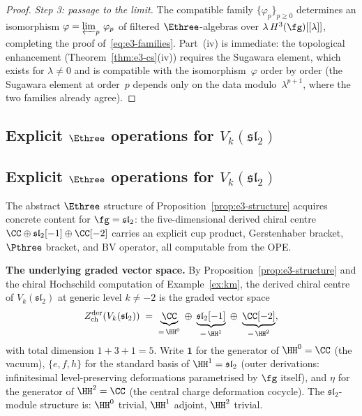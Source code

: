 \begin{proof}
\smallskip
\noindent\textit{Step 3: passage to the limit.}
The compatible family $\{\varphi_p\}_{p \geq 0}$
determines an isomorphism
$\varphi = \varprojlim_p\,\varphi_p$
of filtered $\Ethree$-algebras over
$\lambda\,H^3(\fg)[[\lambda]]$, completing the proof
of~\eqref{eq:e3-families}.
Part~(iv) is immediate: the topological enhancement
(Theorem~\ref{thm:e3-cs}(iv)) requires the Sugawara
element, which exists for $\lambda \neq 0$ and is
compatible with the isomorphism~$\varphi$ order by order
(the Sugawara element at order~$p$ depends only on the
data modulo~$\lambda^{p+1}$, where the two families
already agree).
\end{proof}

\subsection{Explicit $\Ethree$ operations for
$V_k(\mathfrak{sl}_2)$}
\label{subsec:e3-explicit}

\subsection{Explicit $\Ethree$ operations for
$V_k(\mathfrak{sl}_2)$}
\label{subsec:e3-explicit}

The abstract $\Ethree$ structure of
Proposition~\ref{prop:e3-structure} acquires concrete content
for $\fg = \mathfrak{sl}_2$: the five-dimensional derived
chiral centre $\CC \oplus \mathfrak{sl}_2[-1] \oplus \CC[-2]$
carries an explicit cup product, Gerstenhaber bracket,
$\Pthree$ bracket, and BV operator, all computable from the
OPE.

\medskip
\noindent
\textbf{The underlying graded vector space.}
By Proposition~\ref{prop:e3-structure} and the chiral
Hochschild computation of
Example~\ref{ex:km}, the derived chiral centre of
$V_k(\mathfrak{sl}_2)$ at generic level
$k \neq -2$ is the graded vector space
\begin{equation}\label{eq:e3-graded-space}
  Z^{\mathrm{der}}_{\mathrm{ch}}(V_k(\mathfrak{sl}_2))
  \;=\;
  \underbrace{\CC}_{=\, \HH^0}
  \;\oplus\;
  \underbrace{\mathfrak{sl}_2[-1]}_{=\, \HH^1}
  \;\oplus\;
  \underbrace{\CC[-2]}_{=\, \HH^2},
\end{equation}
with total dimension $1 + 3 + 1 = 5$. Write $\mathbf{1}$
for the generator of $\HH^0 = \CC$ (the vacuum),
$\{e, f, h\}$ for the standard basis of
$\HH^1 = \mathfrak{sl}_2$
(outer derivations: infinitesimal level-preserving
deformations parametrised by $\fg$ itself), and $\eta$
for the generator of $\HH^2 = \CC$
(the central charge deformation cocycle). The
$\mathfrak{sl}_2$-module structure is: $\HH^0$ trivial,
$\HH^1$ adjoint, $\HH^2$ trivial.

